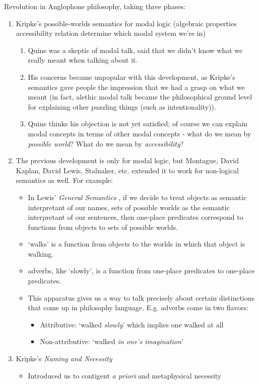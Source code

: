 Revolution in Anglophone philosophy, taking three phases:

\begin{enumerate}
    \item Kripke's possible-worlds semantics for modal logic (algebraic properties accessibility relation determine which modal system we're in) \begin{enumerate}
        \item Quine was a skeptic of modal talk, said that we didn't know what we really meant when talking about it.
        \item His concerns became unpopular with this development, as Kripke's semantics gave people the impression that we had a grasp on what we meant (in fact, alethic modal talk became the philosophical ground level for explaining other puzzling things (such as intentionality)).
        \item  Quine thinks his objection is not yet satisfied; of course we can explain modal concepts in terms of other modal concepts - what do we mean by \emph{possible world}? What do we mean by \emph{accessibility}?
    \end{enumerate}
    \item The previous development is only for modal logic, but Montague, David Kaplan, David Lewis, Stalnaker, etc. extended it to work for non-logical semantics as well. For example: \begin{itemize}
        \item In Lewis' \textit{General Semantics} \cite{lewis1976general}, if we decide to treat objects as semantic interpretant of our names, sets of possible worlds as the semantic interpretant of our sentences, then one-place predicates correspond to functions from objects to sets of possible worlds.
        \item `walks' is a function from objects to the worlds in which that object is walking.
        \item adverbs, like `slowly', is a function from one-place predicates to one-place predicates.
        \item This apparatus gives us a way to talk precisely about certain distinctions that come up in philosophy language. E.g. adverbs come in two flavors: \begin{itemize}
            \item Attributive: `walked \emph{slowly}' which implies one walked at all
            \item Non-attributive: `walked \emph{in one's imagination}'
    \end{itemize}
    \end{itemize}
    \item Kripke's \textit{Naming and Necessity} \cite{kripke1972naming} \begin{itemize}
    \item Introduced us to contigent \textit{a priori} and metaphysical necessity
    \end{itemize}
\end{enumerate}

